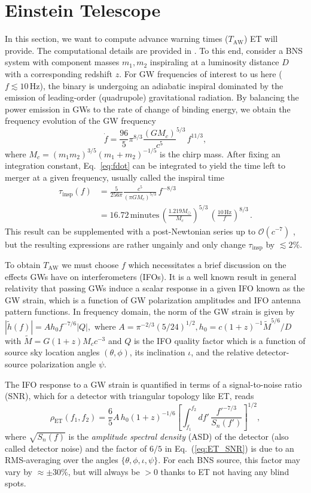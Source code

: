 \documentclass{aa}
\newcommand{\be}{\begin{equation}}
\newcommand{\ee}{\end{equation}}
\newcommand{\f}{\frac}
\newcommand{\nn}{\nonumber}
\newcommand{\ord}{\mathcal{O}}
\begin{document}
\section{Einstein Telescope}
\label{sect:et}
In this section, we want to compute advance warning times ($T_\text{AW}$) ET will provide.
The computational details are provided in \citep{Akcay18}.
To this end, consider a BNS system with component masses
$m_1, m_2$ inspiraling at a luminosity distance $D$ with a corresponding redshift $z$. For GW frequencies of interest to us here ($f \lesssim 10\,$Hz), the binary is undergoing an adiabatic inspiral dominated by
the emission of leading-order (quadrupole)
gravitational radiation. By balancing the
power emission in GWs to the rate of change of binding energy, we obtain the frequency evolution of the GW frequency
%
\be
\dot{f} = \f{96}{5}\pi^{8/3} \f{(G M_c)}{c^5}^{5/3}\, f^{11/3}, \label{eq:fdot}
\ee
where $M_c  = {(m_1 m_2)^{3/5}}{(m_1+m_2)^{-1/5}} $ is the chirp mass.
After fixing an integration constant, Eq.~\ref{eq:fdot}
can be integrated to yield the time left to merger at a given frequency, usually called the inspiral time
%
\begin{align}
\tau_\text{insp}(f) &= \f{5}{256\pi}\f{c^5}{(\pi G M_c)^{5/3}} \,f^{-8/3}\nn\\
&=16.72\,\text{minutes} \, \left(\f{1.219 M_\odot}{M_c}\right)^{5/3}\,\left(\f{10\,\text{Hz}}{f}\right)^{8/3}
\label{eq:tau_insp}\, .
\end{align}
%
This result can be supplemented with a post-Newtonian series up to $\ord(c^{-7})$ \citep{Blanchet_LRR}, but the resulting expressions
are rather ungainly and only change $\tau_\text{insp}$ by $\lesssim 2\%$.

To obtain $T_\text{AW}$ we must choose $f$
which necessitates a brief discussion on the
effects GWs have on interferometers (IFOs).
It is a well known result in general relativity that passing GWs induce a scalar response in a given IFO known as the GW strain, which is a function of GW polarization amplitudes and IFO 
antenna pattern functions. In frequency domain, the norm of the GW strain is given by
%
$|\tilde{h}(f)|=A h_0 f^{-7/6} |Q|,$ %
%
where $A= \pi^{-2/3}(5/24)^{1/2}, h_0 = c  (1+z)^{-1}\tilde{M}^{5/6}/D$ with $\tilde{M}= G  (1+z)M_c c^{-3}$ and $Q$ is the IFO quality factor which is a function of source sky location angles $(\theta,\phi)$, its inclination $\iota$, and the relative detector-source polarization angle $\psi$.

The IFO response to a GW strain is quantified in terms of a signal-to-noise ratio (SNR), which 
for a detector with triangular topology like ET, reads
%
\be
\rho_{\text{ET}}(f_1,f_2) = \f{6}{5}A\, h_0  (1+z)^{-1/6} \left[\int_{f_1}^{f_2} d f'\, \f{f'^{-7/3}}{S_n(f')}\right]^{1/2} \label{eq:ET_SNR},
\ee
%
where %
$\sqrt{S_n(f)}$ is the {\it amplitude spectral density} (ASD) of the detector (also called detector noise) and
the factor of $6/5$ in Eq.~(\ref{eq:ET_SNR})
is due to an RMS-averaging over the angles $\{\theta,\phi,\iota,\psi\}$. 
For each BNS source, this factor may vary by
$\approx \pm 30\%$, but will always be $>0$ thanks to ET not having any blind spots.
\end{document}
